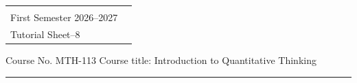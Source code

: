 \documentclass[a4paper,leqno,12pt]{amsart}
\begin{document}
\hspace*{1.9cm}%
\begin{tabular}{@{}p{}p{}@{}}
 {\raggedright
   \begin{center} 
   \textbf{AZIM PREMJI UNIVERSITY, BHOPAL}\\
   First Semester 2026--2027 \\
   Tutorial Sheet--8
   \end{center}
  } %
\end{tabular}


\noindent Course No. MTH-113 \hfill  Course title: Introduction to Quantitative Thinking
\vspace{.3cm}
\hrule 
\vspace{.3cm}
\end{document}

